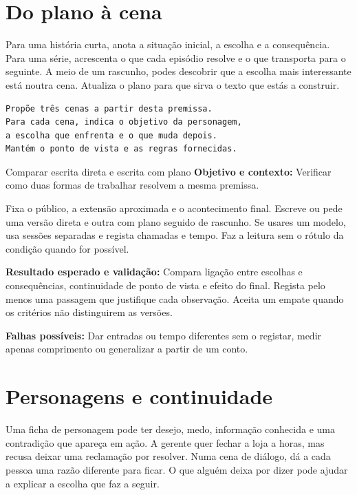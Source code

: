 \section{Do plano à cena}

Para uma história curta, anota a situação inicial, a escolha e a consequência. Para uma série, acrescenta o que cada episódio resolve e o que transporta para o seguinte. A meio de um rascunho, podes descobrir que a escolha mais interessante está noutra cena. Atualiza o plano para que sirva o texto que estás a construir.

\begin{lstlisting}
Propõe três cenas a partir desta premissa.
Para cada cena, indica o objetivo da personagem,
a escolha que enfrenta e o que muda depois.
Mantém o ponto de vista e as regras fornecidas.
\end{lstlisting}

\begin{promptlabbox}{Comparar escrita direta e escrita com plano}
\textbf{Objetivo e contexto:} Verificar como duas formas de trabalhar resolvem a mesma premissa.

Fixa o público, a extensão aproximada e o acontecimento final. Escreve ou pede uma versão direta e outra com plano seguido de rascunho. Se usares um modelo, usa sessões separadas e regista chamadas e tempo. Faz a leitura sem o rótulo da condição quando for possível.

\textbf{Resultado esperado e validação:} Compara ligação entre escolhas e consequências, continuidade de ponto de vista e efeito do final. Regista pelo menos uma passagem que justifique cada observação. Aceita um empate quando os critérios não distinguirem as versões.

\textbf{Falhas possíveis:} Dar entradas ou tempo diferentes sem o registar, medir apenas comprimento ou generalizar a partir de um conto.
\end{promptlabbox}

\section{Personagens e continuidade}

Uma ficha de personagem pode ter desejo, medo, informação conhecida e uma contradição que apareça em ação. A gerente quer fechar a loja a horas, mas recusa deixar uma reclamação por resolver. Numa cena de diálogo, dá a cada pessoa uma razão diferente para ficar. O que alguém deixa por dizer pode ajudar a explicar a escolha que faz a seguir.

